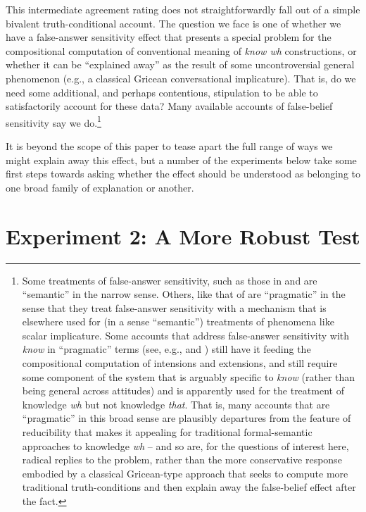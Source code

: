 \documentclass[a4paper]{article}
\begin{document}
This intermediate agreement rating does not straightforwardly fall out of a simple bivalent truth-conditional account. The question we face is one of whether we have a false-answer sensitivity effect that presents a special problem for the compositional computation of conventional meaning of \emph{know wh} constructions, or whether it can be ``explained away'' as the result of some uncontroversial general phenomenon (e.g., a classical Gricean conversational implicature). That is, do we need some additional, and perhaps contentious, stipulation to be able to satisfactorily account for these data? Many available accounts of false-belief sensitivity say we do.\footnote{Some treatments of false-answer sensitivity, such as those in \citet{george:dis} and \citet{theiler:etal} are ``semantic'' in the narrow sense. Others, like that of \citet{kr:11} are ``pragmatic'' in the sense that they treat false-answer sensitivity with a mechanism that is elsewhere used for (in a sense ``semantic'') treatments of phenomena like scalar implicature. Some accounts that address false-answer sensitivity with \textit{know} in ``pragmatic'' terms (see, e.g., \citet{cremers:plurality} and \citet{xiang:sub:16}) still have it feeding the compositional computation of intensions and extensions, and still require some component of the system that is arguably specific to \textit{know} (rather than being general across attitudes) and is apparently used for the treatment of knowledge \textit{wh} but not knowledge \textit{that}. That is, many accounts that are ``pragmatic'' in this broad sense are plausibly departures from the feature of reducibility that makes it appealing for traditional formal-semantic approaches to knowledge \textit{wh} -- and so are, for the questions of interest here, radical replies to the problem, rather than the more conservative response embodied by a classical Gricean-type approach that seeks to compute more traditional truth-conditions and then explain away the false-belief effect after the fact.}

It is beyond the scope of this paper to tease apart the full range of ways we might explain away this effect, but a number of the experiments below take some first steps towards asking whether the effect should be understood as belonging to one broad family of explanation or another.

\section{Experiment 2: A More Robust Test} \label{sec:study2}
\end{document}
